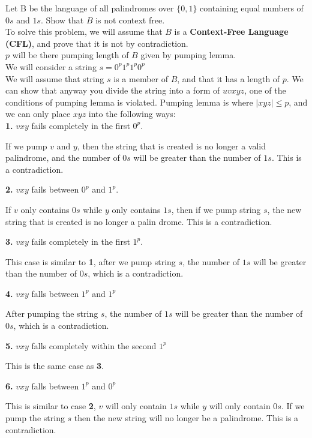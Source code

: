\documentclass[12pt]{article}
\begin{document}
 Let B be the language of all palindromes over $\{0, 1\}$ containing equal numbers of
$0s$ and $1s$. Show that $B$ is not context free. \\

To solve this problem, we will assume that $B$ is a \textbf{Context-Free Language (CFL)},
and prove that it is not by contradiction. \\

$p$ will be there pumping length of $B$ given by pumping lemma. \\
We will consider a string $s = 0^p 1^p 1^p 0^p$ \\

We will assume that string $s$ is a member of $B$, and that it has
a length of $p$. We can show that anyway you divide the string into
a form of $uvxyz$, one of the conditions of pumping lemma is violated.
Pumping lemma is where $|xyz| \le p$, and we can only place $xyz$ into
the following ways: \\

\textbf{1.} $vxy$ fails completely in the first $0^p$.

If we pump $v$ and $y$, then the string that is created is no
longer a valid palindrome, and the number of $0s$ will be greater
than the number of $1s$. This is a contradiction.

\textbf{2.} $vxy$ fails between $0^p$ and $1^p$.

If $v$ only contains $0s$ while $y$ only contains $1s$, then
if we pump string $s$, the new string that is created is no
longer a palin drome. This is a contradiction.

\textbf{3.} $vxy$ fails completely in the first $1^p$.

This case is similar to \textbf{1}, after we pump string $s$,
the number of $1s$ will be greater than the number of $0s$,
which is a contradiction.

\textbf{4.} $vxy$ falls between $1^p$ and $1^p$

After pumping the string $s$, the number of $1s$ will be greater
than the number of $0s$, which is a contradiction.

\textbf{5.} $vxy$ falls completely within the second $1^p$

This is the same case as \textbf{3}.

\textbf{6.} $vxy$ falls between $1^p$ and $0^p$

This is similar to case \textbf{2}, $v$ will only contain
$1s$ while $y$ will only contain $0s$. If we pump the string
$s$ then the new string will no longer be a palindrome.
This is a contradiction.
\end{document}
